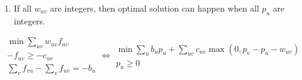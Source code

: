 \begin{itemize}
\begin{enumerate}
      \item If all $w_{uv}$ are integers, then optimal solution can happen when all $p_u$ are integers.
    \end{enumerate}
    $$
    \begin{aligned}\min\sum_{uv} w_{uv}f_{uv} \\ -f_{uv} \geq -c_{uv} \\ \sum_{v} f_{vu} - \sum_{v} f_{uv} = -b_u\end{aligned}
    \Leftrightarrow
    \begin{aligned}\min\sum_{u} b_up_u + \sum_{uv}c_{uv}\max(0, p_v - p_u - w_{uv}) \\ p_u \geq 0 \end{aligned}
    $$
\end{itemize}

